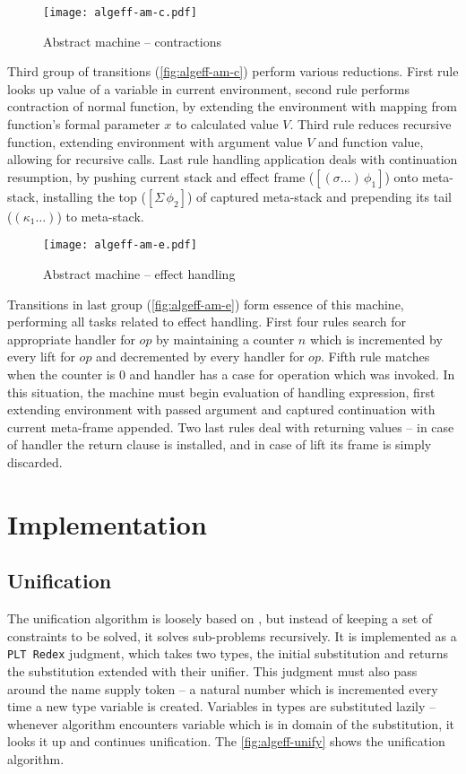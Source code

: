 \documentclass[inz, english, shortabstract]{iithesis}
\newcommand{\Redex}{\texttt{PLT Redex}}
\begin{document}
\begin{figure}[h]
  \centering 
  \texttt{[image: algeff-am-c.pdf]}
  \caption{Abstract machine -- contractions}
  \label{fig:algeff-am-c}
\end{figure}

Third group of transitions (\autoref{fig:algeff-am-c}) perform various reductions.
First rule looks up value of a variable in current environment, second rule performs contraction of normal function, by extending the environment with mapping from function's formal parameter $ x $ to calculated value $ V $.
Third rule reduces recursive function, extending environment with argument value $ V $ and function value, allowing for recursive calls.
Last rule handling application deals with continuation resumption, by pushing current stack and effect frame ($ [(\sigma \ldots) \, \phi_1] $) onto meta-stack, installing the top ($ [\Sigma \, \phi_2] $) of captured meta-stack and prepending its tail ($ (\kappa_1 \ldots) $) to meta-stack.

\begin{figure}[h]
  \centering
  \texttt{[image: algeff-am-e.pdf]}
  \caption{Abstract machine -- effect handling}
  \label{fig:algeff-am-e}
\end{figure}

Transitions in last group (\autoref{fig:algeff-am-e}) form essence of this machine, performing all tasks related to effect handling.
First four rules search for appropriate handler for $ op $ by maintaining a counter $ n $ which is incremented by every lift for $ op $ and decremented by every handler for $ op $.
Fifth rule matches when the counter is $ 0 $ and handler has a case for operation which was invoked. 
In this situation, the machine must begin evaluation of handling expression, first extending environment with passed argument and captured continuation with current meta-frame appended.
Two last rules deal with returning values -- in case of handler the return clause is installed, and in case of lift its frame is simply discarded.

\chapter{Implementation}\label{ch:implementation}
\section{Unification}\label{sec:unification}
The unification algorithm is loosely based on \cite{Pierce2002}, but instead of keeping a set of constraints to be solved, it solves sub-problems recursively.
It is implemented as a \Redex{} judgment, which takes two types, the initial substitution and returns the substitution extended with their unifier.
This judgment must also pass around the name supply token -- a natural number which is incremented every time a new type variable is created.
Variables in types are substituted lazily -- whenever algorithm encounters variable which is in domain of the substitution, it looks it up and continues unification.
The \autoref{fig:algeff-unify} shows the unification algorithm.
\end{document}
